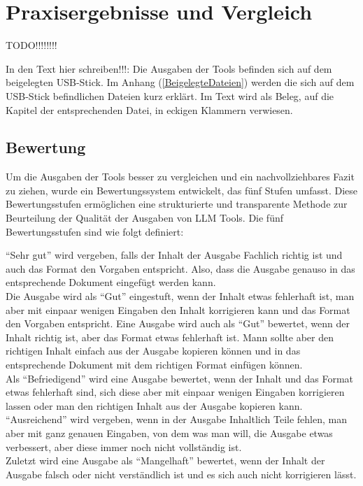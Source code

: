 
\chapter{Praxisergebnisse und Vergleich} 

TODO!!!!!!!!

In den Text hier schreiben!!!: Die Ausgaben der Tools befinden sich auf dem beigelegten USB-Stick. Im Anhang 
(\autoref{BeigelegteDateien}) werden die sich auf dem USB-Stick befindlichen Dateien kurz erklärt. Im Text 
wird als Beleg, auf die Kapitel der entsprechenden Datei, in eckigen Klammern verwiesen. 

\section{Bewertung}  \label{BewertungLLMTools}

Um die Ausgaben der Tools besser zu vergleichen und ein nachvollziehbares Fazit zu ziehen, wurde ein Bewertungssystem 
entwickelt, das fünf Stufen umfasst. Diese Bewertungsstufen ermöglichen eine strukturierte und transparente Methode 
zur Beurteilung der Qualität der Ausgaben von LLM Tools. Die fünf Bewertungsstufen sind wie folgt definiert:

``Sehr gut'' wird vergeben, falls der Inhalt der Ausgabe Fachlich richtig ist und auch das Format den Vorgaben entspricht.
Also, dass die Ausgabe genauso in das entsprechende Dokument eingefügt werden kann.\\
Die Ausgabe wird als ``Gut'' eingestuft, wenn der Inhalt etwas fehlerhaft ist, man aber mit einpaar wenigen Eingaben 
den Inhalt korrigieren kann und das Format den Vorgaben entspricht. Eine Ausgabe wird auch als ``Gut'' bewertet, wenn 
der Inhalt richtig ist, aber das Format etwas fehlerhaft ist. Mann sollte aber den richtigen Inhalt einfach aus der 
Ausgabe kopieren können und in das entsprechende Dokument mit dem richtigen Format einfügen können.\\
Als ``Befriedigend'' wird eine Ausgabe bewertet, wenn der Inhalt und das Format etwas fehlerhaft sind, sich diese aber 
mit einpaar wenigen Eingaben korrigieren lassen oder man den richtigen Inhalt aus der Ausgabe kopieren kann.\\
``Ausreichend'' wird vergeben, wenn in der Ausgabe Inhaltlich Teile fehlen, man aber mit ganz genauen Eingaben, von dem 
was man will, die Ausgabe etwas verbessert, aber diese immer noch nicht vollständig ist.\\
Zuletzt wird eine Ausgabe als ``Mangelhaft'' bewertet, wenn der Inhalt der Ausgabe falsch oder nicht verständlich ist
und es sich auch nicht korrigieren lässt.

